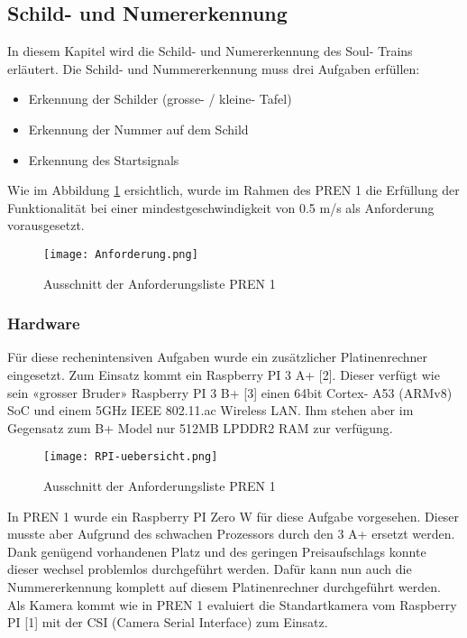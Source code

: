 \documentclass[../../main.tex]{subfiles}
\begin{document}
\subsection{Schild- und Numererkennung}
In diesem Kapitel wird die Schild- und Numererkennung des Soul- Trains erläutert. Die Schild- und Nummererkennung muss drei Aufgaben erfüllen:
\begin{itemize}
  \item Erkennung der Schilder (grosse- / kleine- Tafel)
  \item Erkennung der Nummer auf dem Schild
  \item Erkennung des Startsignals
\end{itemize}

Wie im Abbildung \ref{fig:ausschnitt_Anforderungsliste} ersichtlich, wurde im Rahmen des PREN 1 die Erfüllung der Funktionalität bei einer mindestgeschwindigkeit von 0.5 m/s als Anforderung vorausgesetzt. 

\begin{figure}[H] %
  \centering
  \texttt{[image: Anforderung.png]}
  \caption{Ausschnitt der Anforderungsliste PREN 1}
  \label{fig:ausschnitt_Anforderungsliste}
\end{figure}


\subsubsection{Hardware}
Für diese rechenintensiven Aufgaben wurde ein zusätzlicher Platinenrechner eingesetzt. Zum Einsatz kommt ein Raspberry PI 3 A+ [2]. Dieser verfügt wie sein «grosser Bruder» Raspberry PI 3 B+ [3] einen 64bit Cortex- A53 (ARMv8) SoC und einem 5GHz IEEE 802.11.ac Wireless LAN. Ihm stehen aber im Gegensatz zum B+ Model nur 512MB LPDDR2 RAM zur verfügung.   

\begin{figure}[H] %
  \centering
  \texttt{[image: RPI-uebersicht.png]}
  \caption{Ausschnitt der Anforderungsliste PREN 1}
  \label{fig:rpi-uebersicht}
\end{figure}

In PREN 1 wurde ein Raspberry PI Zero W für diese Aufgabe vorgesehen. Dieser musste aber Aufgrund des schwachen Prozessors durch den 3 A+ ersetzt werden. Dank genügend vorhandenen Platz und des geringen Preisaufschlags konnte dieser wechsel problemlos durchgeführt werden. Dafür kann nun auch die Nummererkennung komplett auf diesem Platinenrechner durchgeführt werden. Als Kamera kommt wie in PREN 1 evaluiert die Standartkamera vom Raspberry PI [1] mit der CSI (Camera Serial Interface) zum Einsatz.
\end{document}
